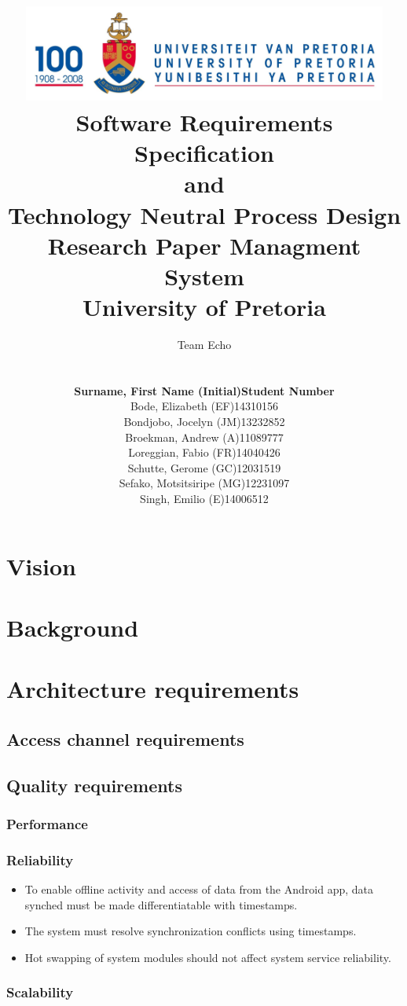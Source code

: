 \documentclass[a4paper,10pt]{article}
\title{\includegraphics[width=12cm]{Eeufeeslogo.jpg} \\
       Software Requirements Specification \\ 
       and \\
       Technology Neutral Process Design \\
       Research Paper Managment System \\
       \vspace{0.5cm}
       University of Pretoria \\
       \vspace{1.0cm}
       }
\date{}
\author{Team Echo\\
	\vspace{0.5cm} \\
	\begin{tabu} to \textwidth { X[l] X[l]}
		\hline
		\textbf{Surname, First Name (Initial)}	& \textbf{Student Number}	\\ \hline \hline
		Bode, Elizabeth (EF)			& 14310156		\\ \hline
		Bondjobo, Jocelyn (JM)		& 13232852		\\ \hline
		Broekman, Andrew (A)		& 11089777		\\ \hline
		Loreggian, Fabio (FR)			& 14040426		\\ \hline
		Schutte, Gerome (GC)		& 12031519		\\ \hline
		Sefako, Motsitsiripe (MG)		& 12231097		\\ \hline
		Singh, Emilio (E)			& 14006512		\\ \hline
		\hline
	\end{tabu}}
\begin{document}
\clearpage
\maketitle
\thispagestyle{empty}

\newpage
{}

\tableofcontents

\newpage
{}

\section{Vision}

\section{Background}

\section{Architecture requirements}
\subsection{Access channel requirements}

\subsection{Quality requirements}
\subsubsection{Performance}

\subsubsection{Reliability}
\begin{itemize}
\item To enable offline activity and access of data from the Android app, data synched must be made differentiatable with timestamps.
\item The system must resolve synchronization conflicts using timestamps.
\item Hot swapping of system modules should not affect system service reliability.
\end{itemize}

\subsubsection{Scalability}
\end{document}
